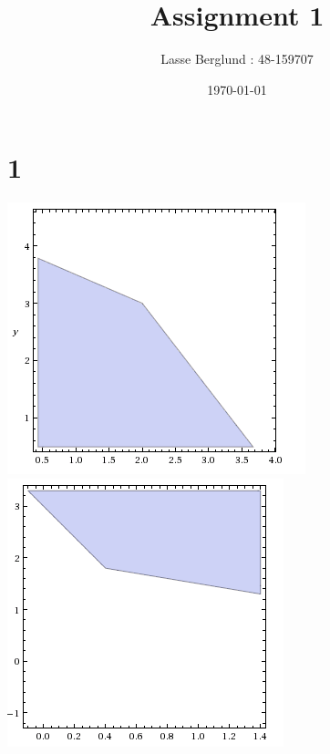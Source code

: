 \documentclass[12pt]{report}
\title{Assignment 1}
\author{Lasse Berglund : 48-159707}
\date{\today}
\begin{document}
\maketitle
\section*{1}
\includegraphics[scale=0.4]{1_a}\\ 
\includegraphics[scale=0.4]{1_b}
\end{document}
